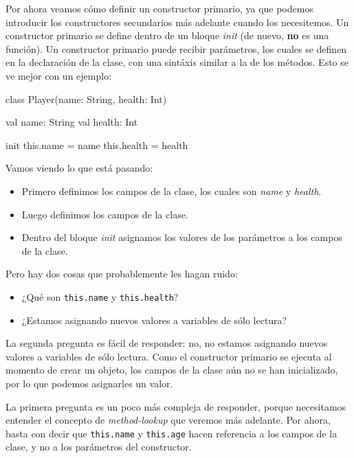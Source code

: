     Por ahora veamos cómo definir un constructor primario, ya que podemos introducir los 
    constructores secundarios más adelante cuando los necesitemos.
    Un constructor primario se define dentro de un bloque \textit{init} (de nuevo, \textbf{no} es 
    una función).
    Un constructor primario puede recibir parámetros, los cuales se definen en la declaración de la
    clase, con una sintáxis similar a la de los métodos.
    Esto se ve mejor con un ejemplo:
    
    \begin{kotlin}
      class Player(name: String, health: Int) {
        val name: String
        val health: Int

        init {
          this.name = name
          this.health = health
        }
      }
    \end{kotlin}
    
    Vamos viendo lo que está pasando:

    \begin{itemize}
      \item Primero definimos los campos de la clase, los cuales son \textit{name} y 
        \textit{health}.
      \item Luego definimos los campos de la clase.
      \item Dentro del bloque \textit{init} asignamos los valores de los parámetros a los campos de
        la clase.
    \end{itemize}

    Pero hay dos cosas que probablemente les hagan ruido:

    \begin{itemize}
      \item ¿Qué son \texttt{this.name} y \texttt{this.health}?
      \item ¿Estamos asignando nuevos valores a variables de sólo lectura? 
    \end{itemize}

    La segunda pregunta es fácil de responder: no, no estamos asignando nuevos valores a variables 
    de sólo lectura.
    Como el constructor primario se ejecuta al momento de crear un objeto, los campos de la clase
    aún no se han inicializado, por lo que podemos asignarles un valor.

    La primera pregunta es un poco más compleja de responder, porque necesitamos entender el 
    concepto de \textit{method-lookup} que veremos más adelante.
    Por ahora, basta con decir que \texttt{this.name} y \texttt{this.age} hacen referencia a los
    campos de la clase, y no a los parámetros del constructor.

